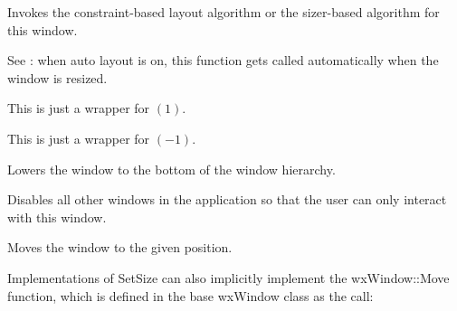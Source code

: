 Invokes the constraint-based layout algorithm or the sizer-based algorithm
for this window.

See : when auto
layout is on, this function gets called automatically when the window is resized.


\label{wxwindowlinedown}

This is just a wrapper for $(1)$.


\label{wxwindowlineup}

This is just a wrapper for $(-1)$.


\label{wxwindowlower}


Lowers the window to the bottom of the window hierarchy.




\label{wxwindowmakemodal}


Disables all other windows in the application so that
the user can only interact with this window.




\label{wxwindowmove}



Moves the window to the given position.






Implementations of SetSize can also implicitly implement the
wxWindow::Move function, which is defined in the base wxWindow class
as the call:

